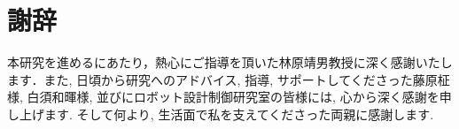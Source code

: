 \chapter*{謝辞}

本研究を進めるにあたり，熱心にご指導を頂いた林原靖男教授に深く感謝いたします．また, 日頃から研究へのアドバイス, 指導, サポートしてくださった藤原柾様, 白須和暉様, 並びにロボット設計制御研究室の皆様には, 心から深く感謝を申し上げます. そして何より, 生活面で私を支えてくださった両親に感謝します. 
%

